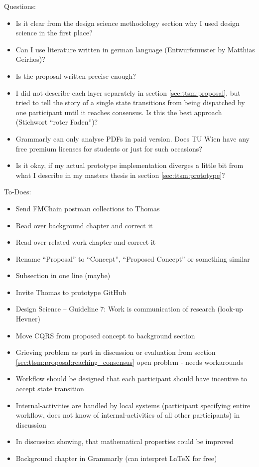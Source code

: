 Questions:
\begin{itemize}
    \item Is it clear from the design science methodology section why I used design science in the first place?
    \item Can I use literature written in german language (Entwurfsmuster by Matthias Geirhos)?
    \item Is the proposal written precise enough?
    \item I did not describe each layer separately in section \ref{sec:ttsm:proposal}, but tried to tell the story of a single state transitions from being dispatched by one participant until it reaches consensus. Is this the best approach (Stichwort ``roter Faden'')?
    \item Grammarly can only analyse PDFs in paid version. Does TU Wien have any free premium licenses for students or just for such occasions?
    \item Is it okay, if my actual prototype implementation diverges a little bit from what I describe in my masters thesis in section \ref{sec:ttsm:prototype}?
\end{itemize}

To-Does:
\begin{itemize}
    \item[\checkmark] Send FMChain postman collections to Thomas
    \item[\checkmark] Read over background chapter and correct it
    \item Read over related work chapter and correct it
    \item[\checkmark] Rename ``Proposal'' to ``Concept'', ``Proposed Concept'' or something similar
    \item[\checkmark] Subsection in one line (maybe)
    \item[\checkmark] Invite Thomas to prototype GitHub
    \item[\checkmark] Design Science -- Guideline 7: Work is communication of research (look-up Hevner)
    \item Move CQRS from proposed concept to background section
    \item Grieving problem as part in discussion or evaluation from section \ref{sec:ttsm:proposal:reaching_consensus} open problem - needs workarounds
    \item Workflow should be designed that each participant should have incentive to accept state transition
    \item[\checkmark] Internal-activities are handled by local systems (participant specifying entire workflow, does not know of internal-activities of all other participants) in discussion
    \item[\checkmark] In discussion showing, that mathematical properties could be improved
    \item[\checkmark] Background chapter in Grammarly (can interpret LaTeX for free)
\end{itemize}


